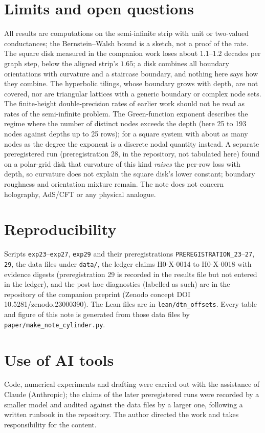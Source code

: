 \documentclass[11pt,a4paper]{article}
\begin{document}
\section{Limits and open questions}
All results are computations on the semi-infinite strip with unit or two-valued conductances; the Bernstein--Walsh bound is a
sketch, not a proof of the rate. The square disk measured in the companion work loses about $1.1$--$1.2$ decades per graph
step, below the aligned strip's $1.65$; a disk combines all boundary orientations with curvature and a staircase boundary,
and nothing here says how they combine. The hyperbolic tilings, whose boundary grows with depth, are not covered, nor are
triangular lattices with a generic boundary or complex node sets. The finite-height double-precision rates of earlier work
should not be read as rates of the semi-infinite problem. The Green-function exponent describes the regime where the number
of distinct nodes exceeds the depth (here 25 to 193 nodes against depths up to 25 rows); for a square system with about as many nodes as the degree the
exponent is a discrete nodal quantity instead. A separate preregistered run (preregistration 28, in the repository, not tabulated here) found on a polar-grid disk that curvature of this kind \emph{raises} the per-row loss with depth, so curvature does not explain the square disk's lower constant; boundary roughness and orientation mixture remain. The note does not concern holography, AdS/CFT or any physical
analogue.

\section*{Reproducibility}
Scripts \texttt{exp23}--\texttt{exp27}, \texttt{exp29} and their preregistrations \texttt{PREREGISTRATION\_23}--\texttt{27}, \texttt{29}, the data files under
\texttt{data/}, the ledger claims H0-X-0014 to H0-X-0018 with evidence digests (preregistration 29 is recorded in the results file but not entered in the ledger), and the post-hoc diagnostics (labelled as such) are in
the repository of the companion preprint (Zenodo concept DOI 10.5281/zenodo.23000390). The Lean files are in \texttt{lean/dtn\_offsets}. Every table and figure of this note is generated
from those data files by \texttt{paper/make\_note\_cylinder.py}.

\section*{Use of AI tools}
Code, numerical experiments and drafting were carried out with the assistance of Claude (Anthropic); the claims of the later
preregistered runs were recorded by a smaller model and audited against the data files by a larger one, following a written
runbook in the repository. The author directed the work and takes responsibility for the content.
\end{document}
